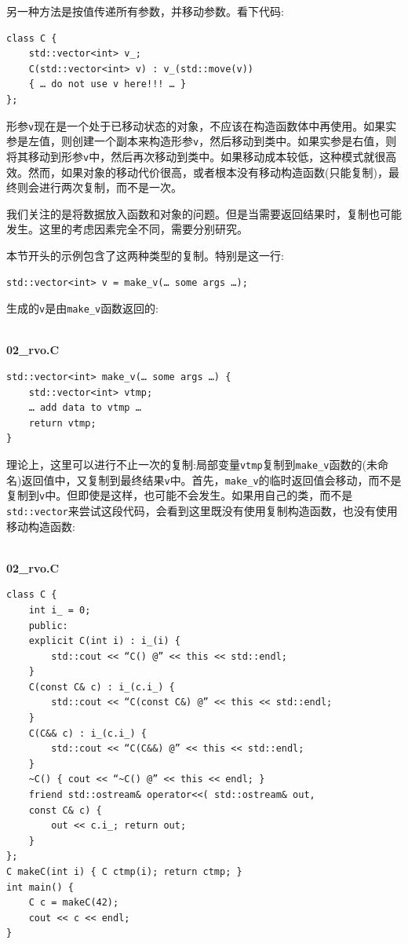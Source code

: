 另一种方法是按值传递所有参数，并移动参数。看下代码:

\begin{lstlisting}[style=styleCXX]
class C {
	std::vector<int> v_;
	C(std::vector<int> v) : v_(std::move(v)) 
	{ … do not use v here!!! … }
};
\end{lstlisting}

形参\texttt{v}现在是一个处于已移动状态的对象，不应该在构造函数体中再使用。如果实参是左值，则创建一个副本来构造形参\texttt{v}，然后移动到类中。如果实参是右值，则将其移动到形参\texttt{v}中，然后再次移动到类中。如果移动成本较低，这种模式就很高效。然而，如果对象的移动代价很高，或者根本没有移动构造函数(只能复制)，最终则会进行两次复制，而不是一次。 

我们关注的是将数据放入函数和对象的问题。但是当需要返回结果时，复制也可能发生。这里的考虑因素完全不同，需要分别研究。


本节开头的示例包含了这两种类型的复制。特别是这一行:

\begin{lstlisting}[style=styleCXX]
std::vector<int> v = make_v(… some args …);
\end{lstlisting}

生成的\texttt{v}是由\texttt{make\_v}函数返回的:

\hspace*{\fill} \\ %
\noindent
\textbf{02\_rvo.C}
\begin{lstlisting}[style=styleCXX]
std::vector<int> make_v(… some args …) {
	std::vector<int> vtmp;
	… add data to vtmp …
	return vtmp;
}
\end{lstlisting}

理论上，这里可以进行不止一次的复制:局部变量\texttt{vtmp}复制到\texttt{make\_v}函数的(未命名)返回值中，又复制到最终结果\texttt{v}中。首先，\texttt{make\_v}的临时返回值会移动，而不是复制到\texttt{v}中。但即使是这样，也可能不会发生。如果用自己的类，而不是\texttt{std::vector}来尝试这段代码，会看到这里既没有使用复制构造函数，也没有使用移动构造函数:

\hspace*{\fill} \\ %
\noindent
\textbf{02\_rvo.C}
\begin{lstlisting}[style=styleCXX]
class C {
	int i_ = 0;
	public:
	explicit C(int i) : i_(i) { 
		std::cout << “C() @” << this << std::endl;
	}
	C(const C& c) : i_(c.i_) {
		std::cout << “C(const C&) @” << this << std::endl;
	}
	C(C&& c) : i_(c.i_) {
		std::cout << “C(C&&) @” << this << std::endl;
	}
	~C() { cout << “~C() @” << this << endl; }
	friend std::ostream& operator<<( std::ostream& out,
	const C& c) {
		out << c.i_; return out;
	}
};  
C makeC(int i) { C ctmp(i); return ctmp; }
int main() {
	C c = makeC(42);
	cout << c << endl;
}
\end{lstlisting}

